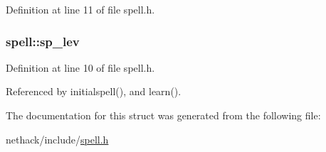 Definition at line 11 of file spell.\+h.

\hypertarget{structspell_af40252a9f2b05db46954175fddc67ee3}{
\subsubsection[{sp\+\_\+lev}]{ spell\+::sp\+\_\+lev}}\label{structspell_af40252a9f2b05db46954175fddc67ee3}


Definition at line 10 of file spell.\+h.



Referenced by initialspell(), and learn().



The documentation for this struct was generated from the following file\+:\begin{DoxyCompactItemize}
\item 
nethack/include/\hyperlink{spell_8h}{spell.\+h}\end{DoxyCompactItemize}
